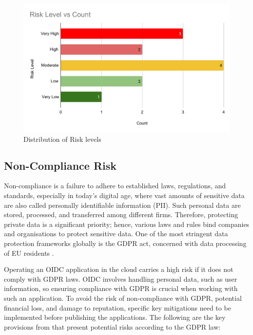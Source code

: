 \begin{figure}[h!]
\centering
\includegraphics[width=\textwidth]{pics/risk_level_vs_count.pdf}
\caption{Distribution of Risk levels}\label{fig:Risk Level Counts}
\end{figure}

\subsection{Non-Compliance Risk}
Non-compliance is a failure to adhere to established laws, regulations, and standards, especially in today's digital age, where vast amounts of sensitive data are also called personally identifiable information (PII). Such personal data are stored, processed, and transferred among different firms. Therefore, protecting private data is a significant priority; hence, various laws and rules bind companies and organisations to protect sensitive data. One of the most stringent data protection frameworks globally is the GDPR act, concerned with data processing of EU residents \citep{gdpr_stringent}. 

Operating an OIDC application in the cloud carries a high risk if it does not comply with GDPR laws. OIDC involves handling personal data, such as user information, so ensuring compliance with GDPR is crucial when working with such an application. To avoid the risk of non-compliance with GDPR, potential financial loss, and damage to reputation, specific key mitigations need to be implemented before publishing the applications. The following are the key provisions from \citep{gdpr_law} that present potential risks according to the GDPR law:


